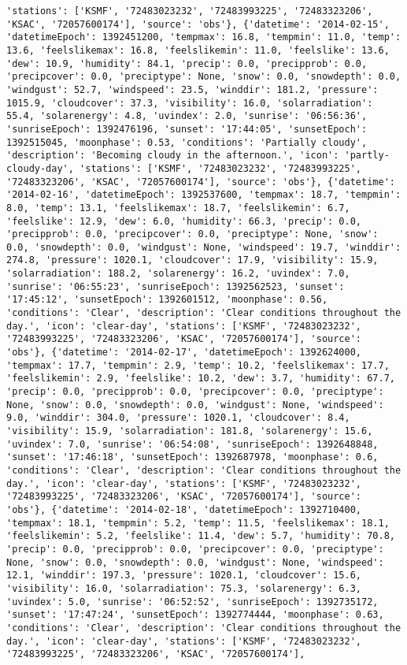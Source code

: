 \documentclass[
  letterpaper,
  DIV=11,
  numbers=noendperiod]{scrartcl}
\begin{document}
\begin{verbatim}
'stations': ['KSMF', '72483023232', '72483993225', '72483323206', 'KSAC', '72057600174'], 'source': 'obs'}, {'datetime': '2014-02-15', 'datetimeEpoch': 1392451200, 'tempmax': 16.8, 'tempmin': 11.0, 'temp': 13.6, 'feelslikemax': 16.8, 'feelslikemin': 11.0, 'feelslike': 13.6, 'dew': 10.9, 'humidity': 84.1, 'precip': 0.0, 'precipprob': 0.0, 'precipcover': 0.0, 'preciptype': None, 'snow': 0.0, 'snowdepth': 0.0, 'windgust': 52.7, 'windspeed': 23.5, 'winddir': 181.2, 'pressure': 1015.9, 'cloudcover': 37.3, 'visibility': 16.0, 'solarradiation': 55.4, 'solarenergy': 4.8, 'uvindex': 2.0, 'sunrise': '06:56:36', 'sunriseEpoch': 1392476196, 'sunset': '17:44:05', 'sunsetEpoch': 1392515045, 'moonphase': 0.53, 'conditions': 'Partially cloudy', 'description': 'Becoming cloudy in the afternoon.', 'icon': 'partly-cloudy-day', 'stations': ['KSMF', '72483023232', '72483993225', '72483323206', 'KSAC', '72057600174'], 'source': 'obs'}, {'datetime': '2014-02-16', 'datetimeEpoch': 1392537600, 'tempmax': 18.7, 'tempmin': 8.0, 'temp': 13.1, 'feelslikemax': 18.7, 'feelslikemin': 6.7, 'feelslike': 12.9, 'dew': 6.0, 'humidity': 66.3, 'precip': 0.0, 'precipprob': 0.0, 'precipcover': 0.0, 'preciptype': None, 'snow': 0.0, 'snowdepth': 0.0, 'windgust': None, 'windspeed': 19.7, 'winddir': 274.8, 'pressure': 1020.1, 'cloudcover': 17.9, 'visibility': 15.9, 'solarradiation': 188.2, 'solarenergy': 16.2, 'uvindex': 7.0, 'sunrise': '06:55:23', 'sunriseEpoch': 1392562523, 'sunset': '17:45:12', 'sunsetEpoch': 1392601512, 'moonphase': 0.56, 'conditions': 'Clear', 'description': 'Clear conditions throughout the day.', 'icon': 'clear-day', 'stations': ['KSMF', '72483023232', '72483993225', '72483323206', 'KSAC', '72057600174'], 'source': 'obs'}, {'datetime': '2014-02-17', 'datetimeEpoch': 1392624000, 'tempmax': 17.7, 'tempmin': 2.9, 'temp': 10.2, 'feelslikemax': 17.7, 'feelslikemin': 2.9, 'feelslike': 10.2, 'dew': 3.7, 'humidity': 67.7, 'precip': 0.0, 'precipprob': 0.0, 'precipcover': 0.0, 'preciptype': None, 'snow': 0.0, 'snowdepth': 0.0, 'windgust': None, 'windspeed': 9.0, 'winddir': 304.0, 'pressure': 1020.1, 'cloudcover': 8.4, 'visibility': 15.9, 'solarradiation': 181.8, 'solarenergy': 15.6, 'uvindex': 7.0, 'sunrise': '06:54:08', 'sunriseEpoch': 1392648848, 'sunset': '17:46:18', 'sunsetEpoch': 1392687978, 'moonphase': 0.6, 'conditions': 'Clear', 'description': 'Clear conditions throughout the day.', 'icon': 'clear-day', 'stations': ['KSMF', '72483023232', '72483993225', '72483323206', 'KSAC', '72057600174'], 'source': 'obs'}, {'datetime': '2014-02-18', 'datetimeEpoch': 1392710400, 'tempmax': 18.1, 'tempmin': 5.2, 'temp': 11.5, 'feelslikemax': 18.1, 'feelslikemin': 5.2, 'feelslike': 11.4, 'dew': 5.7, 'humidity': 70.8, 'precip': 0.0, 'precipprob': 0.0, 'precipcover': 0.0, 'preciptype': None, 'snow': 0.0, 'snowdepth': 0.0, 'windgust': None, 'windspeed': 12.1, 'winddir': 197.3, 'pressure': 1020.1, 'cloudcover': 15.6, 'visibility': 16.0, 'solarradiation': 75.3, 'solarenergy': 6.3, 'uvindex': 5.0, 'sunrise': '06:52:52', 'sunriseEpoch': 1392735172, 'sunset': '17:47:24', 'sunsetEpoch': 1392774444, 'moonphase': 0.63, 'conditions': 'Clear', 'description': 'Clear conditions throughout the day.', 'icon': 'clear-day', 'stations': ['KSMF', '72483023232', '72483993225', '72483323206', 'KSAC', '72057600174'], 
\end{verbatim}
\end{document}
